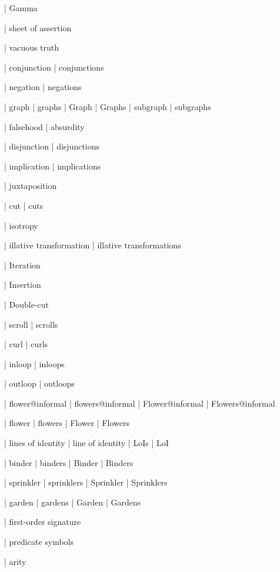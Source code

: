  | Gamma

 | sheet of assertion
 
 | vacuous truth

 | conjunction
 | conjunctions

 | negation
 | negations

 | graph
 | graphs
 | Graph
 | Graphs
 | subgraph
 | subgraphs

 | falsehood
 | absurdity

 | disjunction
 | disjunctions

 | implication
 | implications

 | juxtaposition

 | cut
 | cuts

 | isotropy

 | illative transformation
 | illative transformations

 | Iteration

 | Insertion

 | Double{-}cut

 | scroll
 | scrolls

 | curl
 | curls

 | inloop
 | inloops

 | outloop
 | outloops

 | flower@informal
 | flowers@informal
 | Flower@informal
 | Flowers@informal

 | flower
 | flowers
 | Flower
 | Flowers

 | lines of identity
 | line of identity
 | LoIs
 | LoI

 | binder
 | binders
 | Binder
 | Binders

 | sprinkler
 | sprinklers
 | Sprinkler
 | Sprinklers

 | garden
 | gardens
 | Garden
 | Gardens

 | first-order signature

 | predicate symbols

 | arity

